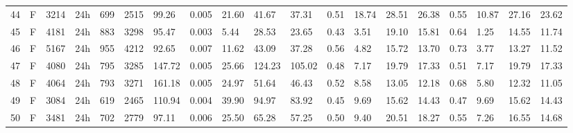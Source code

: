 \begin{tabular}{rllllllrlllllllllll}
44 & F & 3214 & 24h & 699 & 2515 & 99.26 & 0.005 & 21.60 & 41.67 & 37.31 & 0.51 & 18.74 & 28.51 & 26.38 & 0.55 & 10.87 & 27.16 & 23.62 \\
45 & F & 4181 & 24h & 883 & 3298 & 95.47 & 0.003 & 5.44 & 28.53 & 23.65 & 0.43 & 3.51 & 19.10 & 15.81 & 0.64 & 1.25 & 14.55 & 11.74 \\
46 & F & 5167 & 24h & 955 & 4212 & 92.65 & 0.007 & 11.62 & 43.09 & 37.28 & 0.56 & 4.82 & 15.72 & 13.70 & 0.73 & 3.77 & 13.27 & 11.52 \\
47 & F & 4080 & 24h & 795 & 3285 & 147.72 & 0.005 & 25.66 & 124.23 & 105.02 & 0.48 & 7.17 & 19.79 & 17.33 & 0.51 & 7.17 & 19.79 & 17.33 \\
48 & F & 4064 & 24h & 793 & 3271 & 161.18 & 0.005 & 24.97 & 51.64 & 46.43 & 0.52 & 8.58 & 13.05 & 12.18 & 0.68 & 5.80 & 12.32 & 11.05 \\
49 & F & 3084 & 24h & 619 & 2465 & 110.94 & 0.004 & 39.90 & 94.97 & 83.92 & 0.45 & 9.69 & 15.62 & 14.43 & 0.47 & 9.69 & 15.62 & 14.43 \\
50 & F & 3481 & 24h & 702 & 2779 & 97.11 & 0.006 & 25.50 & 65.28 & 57.25 & 0.50 & 9.40 & 20.51 & 18.27 & 0.55 & 7.26 & 16.55 & 14.68 \\
\bottomrule
\end{tabular}
